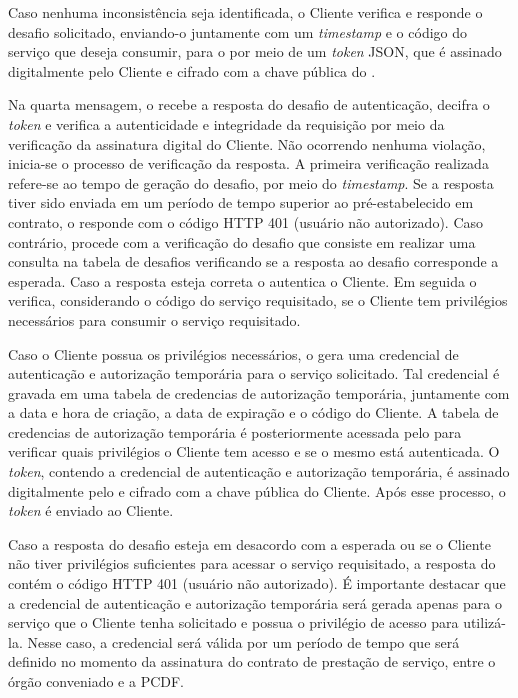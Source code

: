 Caso nenhuma inconsistência seja identificada, o Cliente verifica e responde o desafio solicitado, enviando-o
juntamente com um \emph{timestamp} e o código do serviço que deseja consumir, para o \servidorAA{} por meio de um \emph{token} JSON, que é assinado digitalmente pelo Cliente e cifrado com a chave pública do \servidorAA.

Na quarta mensagem, o \servidorAA{} recebe a resposta do desafio de autenticação, decifra o \emph{token} e verifica a autenticidade e integridade da requisição por meio da verificação da assinatura digital do Cliente. Não ocorrendo nenhuma violação, inicia-se o processo de verificação da resposta. A primeira verificação realizada refere-se ao tempo de geração do desafio, por meio do \emph{timestamp}. Se a resposta tiver sido enviada em um período de tempo superior ao pré-estabelecido em contrato, o \servidorAA{} responde com o código HTTP 401 (usuário não autorizado). Caso contrário, procede com a verificação do desafio que consiste em realizar uma consulta na tabela de desafios verificando se a resposta ao desafio corresponde a esperada. Caso a resposta esteja correta o \servidorAA{}
autentica o Cliente. Em seguida o \servidorAA{} verifica, considerando o código do serviço requisitado, se o Cliente tem privilégios necessários para consumir o serviço requisitado.

Caso o Cliente possua os privilégios necessários, o \servidorAA{} gera uma credencial de autenticação e autorização temporária para o serviço solicitado. Tal credencial é gravada em uma tabela de credencias de autorização temporária, juntamente com a data e hora de criação, a data de expiração e o código do Cliente. A tabela de credencias de autorização temporária é posteriormente acessada pelo \servidorRest{} para verificar quais privilégios o Cliente tem acesso e se o mesmo está autenticada. O \emph{token}, contendo a credencial de autenticação e autorização temporária, é  assinado digitalmente pelo \servidorAA{} e cifrado  com a chave pública do Cliente. Após esse processo, o \emph{token} é enviado ao Cliente.

Caso a resposta do desafio esteja em desacordo com a esperada ou se o Cliente não tiver privilégios suficientes para acessar o serviço requisitado, a resposta do \servidorAA{} contém o código HTTP 401 (usuário não autorizado).
É importante destacar que a credencial de autenticação e autorização temporária será gerada apenas para o serviço que o Cliente tenha solicitado e possua o privilégio de acesso para utilizá-la. Nesse caso, a credencial será válida por um período  de tempo que será definido no momento da assinatura do contrato de prestação de serviço,
entre o órgão conveniado e a PCDF.

